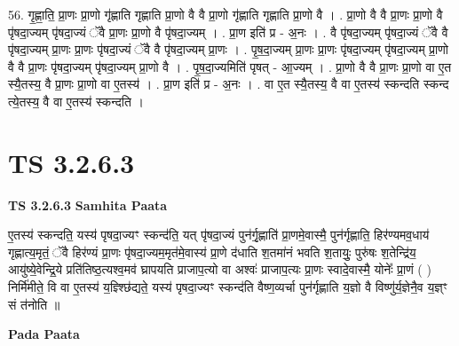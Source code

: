 \documentclass[17pt]{extarticle}
\begin{document}
56. गृ॒ह्णा॒ति॒ प्रा॒णः प्रा॒णो गृ॑ह्णाति गृह्णाति प्रा॒णो वै वै प्रा॒णो गृ॑ह्णाति गृह्णाति प्रा॒णो वै । . प्रा॒णो वै वै प्रा॒णः प्रा॒णो वै पृ॑षदा॒ज्यम् पृ॑षदा॒ज्यं ॅवै प्रा॒णः प्रा॒णो वै पृ॑षदा॒ज्यम् । . प्रा॒ण इति॑ प्र - अ॒नः । . वै पृ॑षदा॒ज्यम् पृ॑षदा॒ज्यं ॅवै वै पृ॑षदा॒ज्यम् प्रा॒णः प्रा॒णः पृ॑षदा॒ज्यं ॅवै वै पृ॑षदा॒ज्यम् प्रा॒णः । . पृ॒ष॒दा॒ज्यम् प्रा॒णः प्रा॒णः पृ॑षदा॒ज्यम् पृ॑षदा॒ज्यम् प्रा॒णो वै वै प्रा॒णः पृ॑षदा॒ज्यम् पृ॑षदा॒ज्यम् प्रा॒णो वै । . पृ॒ष॒दा॒ज्यमिति॑ पृषत् - आ॒ज्यम् । . प्रा॒णो वै वै प्रा॒णः प्रा॒णो वा ए॒त स्यै॒तस्य॒ वै प्रा॒णः प्रा॒णो वा ए॒तस्य॑ । . प्रा॒ण इति॑ प्र - अ॒नः । . वा ए॒त स्यै॒तस्य॒ वै वा ए॒तस्य॑ स्कन्दति स्कन्द त्ये॒तस्य॒ वै वा ए॒तस्य॑ स्कन्दति । \newline
\pagebreak
{}

\section{ TS 3.2.6.3 }

\textbf{TS 3.2.6.3 } \newline
\textbf{Samhita Paata} \newline

ए॒तस्य॑ स्कन्दति॒ यस्य॑ पृषदा॒ज्यꣳ स्कन्द॑ति॒ यत् पृ॑षदा॒ज्यं पुन॑र्गृ॒ह्णाति॑ प्रा॒णमे॒वास्मै॒ पुन॑र्गृह्णाति॒ हिर॑ण्यमव॒धाय॑ गृह्णात्य॒मृतं॒ ॅवै हिर॑ण्यं प्रा॒णः पृ॑षदा॒ज्यम॒मृत॑मे॒वास्य॑ प्रा॒णे द॑धाति श॒तमा॑नं भवति श॒तायुः॒ पुरु॑षः श॒तेन्द्रि॑य॒ आयु॑ष्ये॒वेन्द्रि॒ये प्रति॑तिष्ठ॒त्यश्व॒मव॑ घ्रापयति प्राजाप॒त्यो वा अश्वः॑ प्राजाप॒त्यः प्रा॒णः स्वादे॒वास्मै॒ योनेः᳚ प्रा॒णं ( ) निर्मि॑मीते॒ वि वा ए॒तस्य॑ य॒ज्ञ्श्छि॑द्यते॒ यस्य॑ पृषदा॒ज्यꣳ स्कन्द॑ति वैष्ण॒व्यर्चा पुन॑र्गृह्णाति य॒ज्ञो वै विष्णु॑र्य॒ज्ञेनै॒व य॒ज्ञ्ꣳ सं त॑नोति ॥ \newline

\textbf{Pada Paata} \newline
\end{document}
